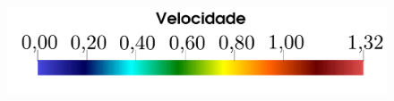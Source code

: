\begin{figure}[!htbp]
	 \\
	{\includegraphics[trim=0cm 0.2cm 0cm 0cm,clip=true,scale=0.3]{Imagens/Cap2/cilindro_legendaVel.pdf}}
	\label{fig:cilindro_camposVel}
\end{figure}

